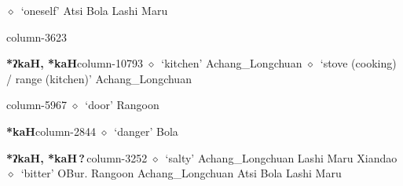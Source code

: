          $\diamond$~`oneself'
         Atsi 
\hspace{1ex}
         Bola 
\hspace{1ex}
         Lashi 
\hspace{1ex}
         Maru 
  \item {\footnotesize \textbf{}}{\tiny column-3623}
  \item {\footnotesize \textbf{*ʔkaH, *kaH}}{\tiny column-10793}
         $\diamond$~`kitchen'
         Achang\_Longchuan 
\hspace{1ex}
         $\diamond$~`stove (cooking) / range (kitchen)'
         Achang\_Longchuan 
  \item {\footnotesize \textbf{}}{\tiny column-5967}
         $\diamond$~`door'
         Rangoon 
  \item {\footnotesize \textbf{*kaH}}{\tiny column-2844}
         $\diamond$~`danger'
         Bola 
  \item {\footnotesize \textbf{*ʔkaH, *kaH\,?\,}}{\tiny column-3252}
         $\diamond$~`salty'
         Achang\_Longchuan 
\hspace{1ex}
         Lashi 
\hspace{1ex}
         Maru 
\hspace{1ex}
         Xiandao 
\hspace{1ex}
         $\diamond$~`bitter'
         OBur. 
\hspace{1ex}
         Rangoon 
\hspace{1ex}
         Achang\_Longchuan 
\hspace{1ex}
         Atsi 
\hspace{1ex}
         Bola 
\hspace{1ex}
         Lashi 
\hspace{1ex}
         Maru 
\hspace{1ex}
